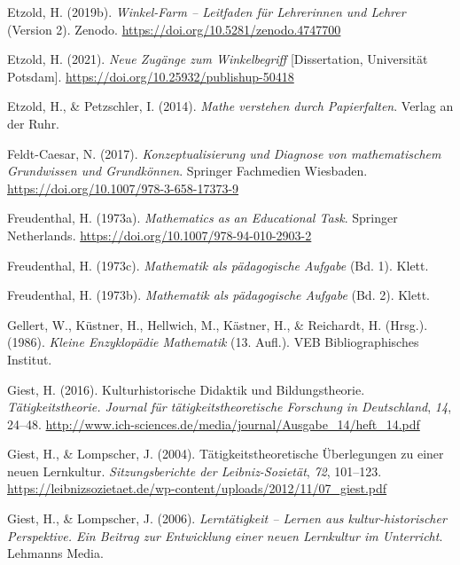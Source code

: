 \documentclass[
]{scrbook}
\newlength{\cslhangindent}
\newenvironment{CSLReferences}[2] %
 {\begin{list}{}{%
  \setlength{\itemindent}{0pt}
  \setlength{\leftmargin}{0pt}
  \setlength{\parsep}{0pt}
  \ifodd #1
   \setlength{\leftmargin}{\cslhangindent}
   \setlength{\itemindent}{-1\cslhangindent}
  \fi
  \setlength{\itemsep}{#2\baselineskip}}}
 {\end{list}}
\theoremstyle{definition}
\theoremstyle{definition}
\theoremstyle{definition}
\theoremstyle{definition}
\theoremstyle{remark}
\begin{document}
\begin{CSLReferences}{1}{0}
Etzold, H. (2019b). \emph{Winkel-{Farm} -- {Leitfaden} für {Lehrerinnen} und {Lehrer}} (Version 2). Zenodo. \url{https://doi.org/10.5281/zenodo.4747700}

Etzold, H. (2021). \emph{Neue Zugänge zum Winkelbegriff} {[}Dissertation, Universität Potsdam{]}. \url{https://doi.org/10.25932/publishup-50418}

Etzold, H., \& Petzschler, I. (2014). \emph{Mathe verstehen durch {Papierfalten}}. Verlag an der Ruhr.

Feldt-Caesar, N. (2017). \emph{Konzeptualisierung und {Diagnose} von mathematischem {Grundwissen} und {Grundkönnen}}. Springer Fachmedien Wiesbaden. \url{https://doi.org/10.1007/978-3-658-17373-9}

Freudenthal, H. (1973a). \emph{Mathematics as an {Educational} {Task}}. Springer Netherlands. \url{https://doi.org/10.1007/978-94-010-2903-2}

Freudenthal, H. (1973c). \emph{Mathematik als pädagogische {Aufgabe}} (Bd. 1). Klett.

Freudenthal, H. (1973b). \emph{Mathematik als pädagogische {Aufgabe}} (Bd. 2). Klett.

Gellert, W., Küstner, H., Hellwich, M., Kästner, H., \& Reichardt, H. (Hrsg.). (1986). \emph{Kleine {Enzyklopädie} {Mathematik}} (13. Aufl.). VEB Bibliographisches Institut.

Giest, H. (2016). Kulturhistorische {Didaktik} und {Bildungstheorie}. \emph{Tätigkeitstheorie. Journal für tätigkeitstheoretische Forschung in Deutschland}, \emph{14}, 24--48. \url{http://www.ich-sciences.de/media/journal/Ausgabe_14/heft_14.pdf}

Giest, H., \& Lompscher, J. (2004). Tätigkeitstheoretische Überlegungen zu einer neuen {Lernkultur}. \emph{Sitzungsberichte der Leibniz-Sozietät}, \emph{72}, 101--123. \url{https://leibnizsozietaet.de/wp-content/uploads/2012/11/07_giest.pdf}

Giest, H., \& Lompscher, J. (2006). \emph{Lerntätigkeit -- {Lernen} aus kultur-historischer {Perspektive}. {Ein} {Beitrag} zur {Entwicklung} einer neuen {Lernkultur} im {Unterricht}}. Lehmanns Media.


\end{CSLReferences}
\end{document}
